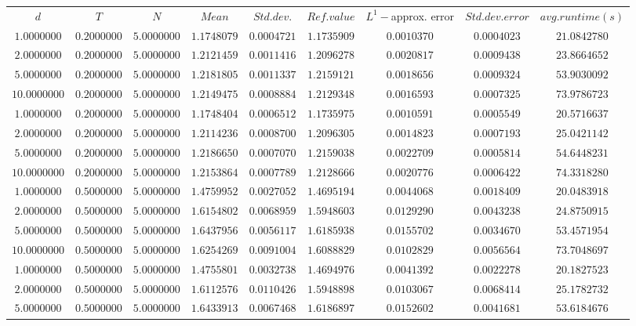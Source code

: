 \begin{tabular}{ccccccccc}
$d$ & $T$ & $N$ & $Mean$ & $Std. dev.$ & $Ref. value$ & $L^1-$approx. error & $Std. dev. error$ & $avg. runtime (s)$\\
$1.0000000$ & $0.2000000$ & $5.0000000$ & $1.1748079$ & $0.0004721$ & $1.1735909$ & $0.0010370$ & $0.0004023$ & $21.0842780$\\
$2.0000000$ & $0.2000000$ & $5.0000000$ & $1.2121459$ & $0.0011416$ & $1.2096278$ & $0.0020817$ & $0.0009438$ & $23.8664652$\\
$5.0000000$ & $0.2000000$ & $5.0000000$ & $1.2181805$ & $0.0011337$ & $1.2159121$ & $0.0018656$ & $0.0009324$ & $53.9030092$\\
$10.0000000$ & $0.2000000$ & $5.0000000$ & $1.2149475$ & $0.0008884$ & $1.2129348$ & $0.0016593$ & $0.0007325$ & $73.9786723$\\
$1.0000000$ & $0.2000000$ & $5.0000000$ & $1.1748404$ & $0.0006512$ & $1.1735975$ & $0.0010591$ & $0.0005549$ & $20.5716637$\\
$2.0000000$ & $0.2000000$ & $5.0000000$ & $1.2114236$ & $0.0008700$ & $1.2096305$ & $0.0014823$ & $0.0007193$ & $25.0421142$\\
$5.0000000$ & $0.2000000$ & $5.0000000$ & $1.2186650$ & $0.0007070$ & $1.2159038$ & $0.0022709$ & $0.0005814$ & $54.6448231$\\
$10.0000000$ & $0.2000000$ & $5.0000000$ & $1.2153864$ & $0.0007789$ & $1.2128666$ & $0.0020776$ & $0.0006422$ & $74.3318280$\\
$1.0000000$ & $0.5000000$ & $5.0000000$ & $1.4759952$ & $0.0027052$ & $1.4695194$ & $0.0044068$ & $0.0018409$ & $20.0483918$\\
$2.0000000$ & $0.5000000$ & $5.0000000$ & $1.6154802$ & $0.0068959$ & $1.5948603$ & $0.0129290$ & $0.0043238$ & $24.8750915$\\
$5.0000000$ & $0.5000000$ & $5.0000000$ & $1.6437956$ & $0.0056117$ & $1.6185938$ & $0.0155702$ & $0.0034670$ & $53.4571954$\\
$10.0000000$ & $0.5000000$ & $5.0000000$ & $1.6254269$ & $0.0091004$ & $1.6088829$ & $0.0102829$ & $0.0056564$ & $73.7048697$\\
$1.0000000$ & $0.5000000$ & $5.0000000$ & $1.4755801$ & $0.0032738$ & $1.4694976$ & $0.0041392$ & $0.0022278$ & $20.1827523$\\
$2.0000000$ & $0.5000000$ & $5.0000000$ & $1.6112576$ & $0.0110426$ & $1.5948898$ & $0.0103067$ & $0.0068414$ & $25.1782732$\\
$5.0000000$ & $0.5000000$ & $5.0000000$ & $1.6433913$ & $0.0067468$ & $1.6186897$ & $0.0152602$ & $0.0041681$ & $53.6184676$\\

\end{tabular}
